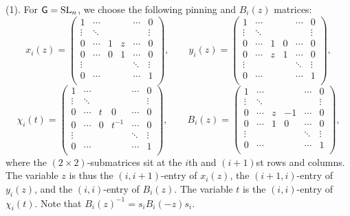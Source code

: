 \begin{example} (1). For $\mathsf{G}=\operatorname{SL}_n$, we choose the following pinning and $B_i(z)$ matrices:
\begin{equation}\label{eq:pinning1}
x_{i}(z) = \begin{pmatrix}
1 & \cdots  & & & \cdots & 0\\
\vdots & \ddots & & & & \vdots\\
0 & \cdots & 1 & z & \cdots & 0\\
0 & \cdots & 0 & 1 & \cdots & 0\\
\vdots &  & & &\ddots & \vdots\\
0 & \cdots & & & \cdots & 1\\
\end{pmatrix},\qquad
y_{i}(z) = \begin{pmatrix}
1 & \cdots  & & & \cdots & 0\\
\vdots & \ddots & & & & \vdots\\
0 & \cdots & 1 & 0 & \cdots & 0\\
0 & \cdots & z & 1 & \cdots & 0\\
\vdots &  & & &\ddots & \vdots\\
0 & \cdots & & & \cdots & 1\\
\end{pmatrix},
\end{equation}
\begin{equation}\label{eq:pinning1}
\chi_{i}(t) = \begin{pmatrix}
1 & \cdots  & & & \cdots & 0\\
\vdots & \ddots & & & & \vdots\\
0 & \cdots & t & 0 & \cdots & 0\\
0 & \cdots & 0 & t^{-1} & \cdots & 0\\
\vdots &  & & &\ddots & \vdots\\
0 & \cdots & & & \cdots & 1\\
\end{pmatrix},\qquad
B_{i}(z) = \begin{pmatrix}
1 & \cdots  & & & \cdots & 0\\
\vdots & \ddots & & & & \vdots\\
0 & \cdots & z & -1 & \cdots & 0\\
0 & \cdots & 1 & 0 & \cdots & 0\\
\vdots &  & & &\ddots & \vdots\\
0 & \cdots & & & \cdots & 1\\
\end{pmatrix},
\end{equation}
where the $(2\times 2)$-submatrices sit at the $i$th and $(i + 1)$st rows and columns. The variable $z$ is thus the $(i,i+1)$-entry of $x_i(z)$, the $(i+1,i)$-entry of $y_i(z)$, and the $(i,i)$-entry of $B_i(z)$. The variable $t$ is the $(i,i)$-entry of $\chi_i(t)$. Note that $B_i(z)^{-1}=s_iB_i(-z)s_i$.\\


\end{example}
